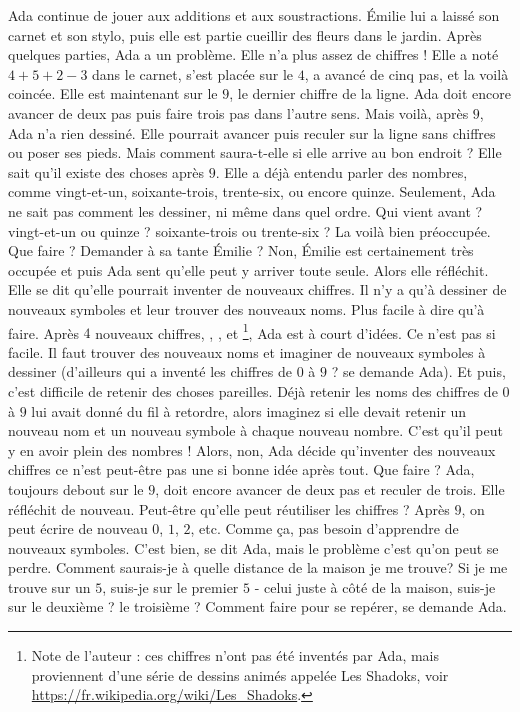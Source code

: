 Ada continue de jouer aux additions et aux soustractions. 
Émilie lui a laissé son carnet et son stylo, puis elle est partie cueillir des fleurs dans le jardin. 
Après quelques parties, Ada a un problème. 
Elle n’a plus assez de chiffres ! 
Elle a noté $4 + 5 + 2 - 3$ dans le carnet, s’est placée sur le $4$, a avancé de cinq pas, et la voilà coincée. 
Elle est maintenant sur le $9$, le dernier chiffre de la ligne. 
Ada doit encore avancer de deux pas puis faire trois pas dans l’autre sens.
Mais voilà, après $9$, Ada n’a rien dessiné.
Elle pourrait avancer puis reculer sur la ligne sans chiffres ou poser ses pieds. Mais comment saura-t-elle si elle arrive au bon endroit ? 
Elle sait qu’il existe des choses après $9$. 
Elle a déjà entendu parler des nombres, comme vingt-et-un, soixante-trois, trente-six, ou encore quinze. 
Seulement, Ada ne sait pas comment les dessiner, ni même dans quel ordre.
Qui vient avant ? vingt-et-un ou quinze ? soixante-trois ou trente-six ?
La voilà bien préoccupée. Que faire ? Demander à sa tante Émilie ? Non, Émilie est certainement très occupée et puis Ada sent qu’elle peut y arriver toute seule. Alors elle réfléchit. Elle se dit qu’elle pourrait inventer de nouveaux chiffres.
Il n’y a qu'à dessiner de nouveaux symboles et leur trouver des nouveaux noms. Plus facile à dire qu'à faire. Après $4$ nouveaux chiffres, , ,  et \footnote{Note de l'auteur : ces chiffres n'ont pas été inventés par Ada, mais proviennent d'une série de dessins animés appelée Les Shadoks, voir \url{https://fr.wikipedia.org/wiki/Les_Shadoks}.}, Ada est à court d'idées.
Ce n’est pas si facile. Il faut trouver des nouveaux noms et imaginer de nouveaux symboles à dessiner (d’ailleurs qui a inventé les chiffres de $0$ à $9$ ? se demande Ada). Et puis, c’est difficile de retenir des choses pareilles. Déjà retenir les noms des chiffres de $0$ à $9$ lui avait donné du fil à retordre, alors imaginez si elle devait retenir un nouveau nom et un nouveau symbole à chaque nouveau nombre.
C’est qu’il peut y en avoir plein des nombres ! 
Alors, non, Ada décide qu’inventer des nouveaux chiffres ce n’est peut-être pas une si bonne idée après tout. 
Que faire ? Ada, toujours debout sur le $9$, doit encore avancer de deux pas et reculer de trois. Elle réfléchit de nouveau. Peut-être qu’elle peut réutiliser les chiffres ? 
Après $9$, on peut écrire de nouveau $0$, $1$, $2$, etc. Comme ça, pas besoin d’apprendre de nouveaux symboles. C’est bien, se dit Ada, mais le problème c’est qu’on peut se perdre. 
Comment saurais-je à quelle distance de la maison je me trouve? Si je me trouve sur un $5$, suis-je sur le premier $5$ - celui juste à côté de la maison, suis-je sur le deuxième ? le troisième ? Comment faire pour se repérer, se demande Ada.
